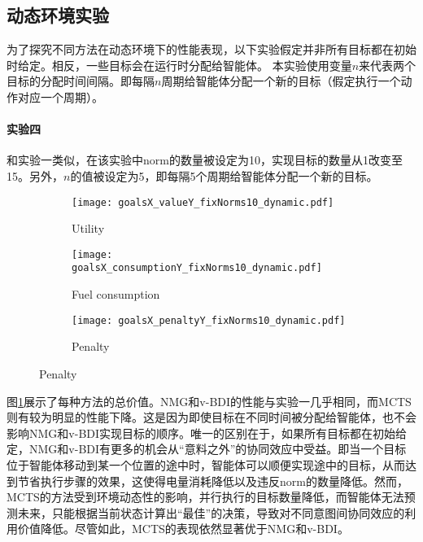 \subsection{动态环境实验}
为了探究不同方法在动态环境下的性能表现，以下实验假定并非所有目标都在初始时给定。相反，一些目标会在运行时分配给智能体。
%
本实验使用变量$n$来代表两个目标的分配时间间隔。即每隔$n$周期给智能体分配一个新的目标（假定执行一个动作对应一个周期）。

\paragraph{实验四}
和实验一类似，在该实验中norm的数量被设定为10，实现目标的数量从1改变至15。另外，$n$的值被设定为5，即每隔5个周期给智能体分配一个新的目标。
\begin{figure}
\centering
\begin{subfigure}{.47\textwidth}
  \centering
  \texttt{[image: goalsX\_valueY\_fixNorms10\_dynamic.pdf]}
  \captionsetup{justification=centering}
  \caption{Utility}
  \label{fig:goalsX_valueY_fixNorms10_dynamic}
\end{subfigure}

\begin{subfigure}{.47\textwidth}
  \centering
  \texttt{[image: goalsX\_consumptionY\_fixNorms10\_dynamic.pdf]}
  \captionsetup{justification=centering}
  \caption{Fuel consumption}
  \label{fig:goalsX_consumptionY_fixNorms10_dynamic}
\end{subfigure}
\begin{subfigure}{.47\textwidth}
  \centering
  \texttt{[image: goalsX\_penaltyY\_fixNorms10\_dynamic.pdf]}
  \captionsetup{justification=centering}
  \caption{Penalty}
  \label{fig:goalsX_penaltyY_fixNorms10_dynamic}
\end{subfigure}
\captionsetup{justification=centering}
\label{fig:all_fixNorms10_dynamic}
\end{figure}

图\ref{fig:goalsX_valueY_fixNorms10_dynamic}展示了每种方法的总价值。NMG和v-BDI的性能与实验一几乎相同，而MCTS则有较为明显的性能下降。这是因为即使目标在不同时间被分配给智能体，也不会影响NMG和v-BDI实现目标的顺序。唯一的区别在于，如果所有目标都在初始给定，NMG和v-BDI有更多的机会从“意料之外”的协同效应中受益。即当一个目标位于智能体移动到某一个位置的途中时，智能体可以顺便实现途中的目标，从而达到节省执行步骤的效果，这使得电量消耗降低以及违反norm的数量降低。然而，MCTS的方法受到环境动态性的影响，并行执行的目标数量降低，而智能体无法预测未来，只能根据当前状态计算出“最佳”的决策，导致对不同意图间协同效应的利用价值降低。尽管如此，MCTS的表现依然显著优于NMG和v-BDI。

